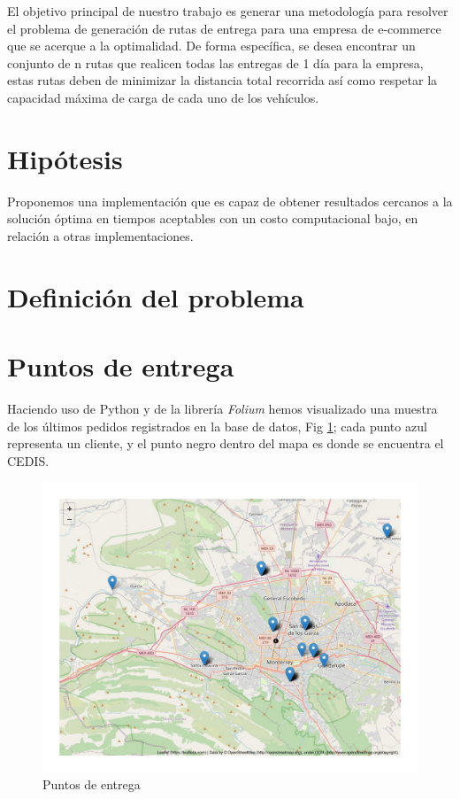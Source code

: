 \documentclass[journal]{IEEEtran}
\begin{document}
        El objetivo principal de nuestro trabajo es generar una metodología para resolver el problema de generación de rutas de entrega para una empresa de e-commerce que se acerque a la optimalidad. De forma específica, se desea encontrar un conjunto de n rutas que realicen todas las entregas de 1 día para la empresa, estas rutas deben de minimizar la distancia total recorrida así como respetar la capacidad máxima de carga de cada uno de los vehículos.

    \section{Hipótesis} \label{sec:hyp}
            
        Proponemos una implementación que es capaz de obtener resultados cercanos a la solución óptima en tiempos aceptables con un costo computacional bajo, en relación a otras implementaciones.

    \section{Definición del problema} \label{definition}
        
    
    \section{Puntos de entrega}
        
        Haciendo uso de Python y de la librería \emph{Folium} hemos visualizado una muestra de los últimos pedidos registrados en la base de datos, Fig \ref{puntos-entrega-mapa}; cada punto azul representa un cliente, y el punto negro dentro del mapa es donde se encuentra el CEDIS.
        
        \begin{figure}[!ht]
            \centering
            \includegraphics[scale=0.3]{img/deliveries-plot.pdf}
            \caption{Puntos de entrega} 
            \label{puntos-entrega-mapa}
        \end{figure}
    
\end{document}
